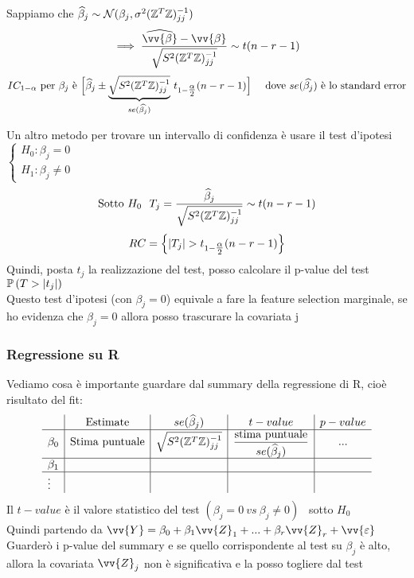 

Sappiamo che 
$\widehat{\beta}_j  \sim \mathcal N(\beta_j, \sigma^2(\mathbb Z^T\mathbb Z)^{-1}_{jj})$
\[
\implies \frac{\hat{\vv{\beta}}-\vv{\beta}}{\sqrt{S^2 (\ZZ^T\ZZ)^{-1}_{jj}}} \sim t(n-r-1)
\]
\[
IC_{1-\alpha} \text{ per } \beta_j  \text{ è } \Big[
\hat{\beta}_j \pm \UB{ se(\hat{\beta_j})}{\sqrt{S^2(\ZZ^T\ZZ)^{-1}_{jj}}} \ t_{1-\tfrac{\alpha}{2}}(n-r-1)\Big] \ \ \ \text{ dove } se (\hat{\beta_j}) \text{ è lo standard error}\skipp
\]
\phantom{}

Un altro metodo per trovare un intervallo di confidenza è usare il  test d'ipotesi $\begin{cases}
    H_0 : \beta_j =0 \\
    H_1 : \beta_j \ne 0
\end{cases}$
\[
\text{Sotto } H_0 \ \ T_j = \dfrac{\widehat{\beta}_j}{\sqrt{S^2(\mathbb Z^T\mathbb Z)^{-1}_{jj}}} \sim t(n-r-1)
\]
\[
RC = \OOO |T_j|> t_{1-\tfrac{\alpha}{2}} (n-r-1) \CCC 
\]
Quindi, posta $t_j$ la realizzazione del test, posso calcolare il p-value del test $\mathbb{P} \left( T>|t_j| \right)$\\

Questo test d'ipotesi (con $\beta_j=0$) equivale a fare la feature selection marginale, se ho evidenza che $\beta_j=0$ allora posso trascurare la covariata j\\

\newpage

\subsubsection*{Regressione su R}

Vediamo cosa è importante guardare dal summary della regressione di R, cioè risultato del fit:
\[
\begin{array}{l|c|c|c|c}

     & \text{Estimate} & se(\widehat{\beta}_j) & t-value & p-value  \\
     \hline
     \beta_0 & \text{Stima puntuale} & \sqrt{S^2(\mathbb Z^T\mathbb Z)^{-1}_{jj}} & \dfrac{\text{stima puntuale}}{se(\widehat{\beta}_j)} & ...\\
     \hline
     \beta_1 &  &  &  & \\
     \hline
     \vdots &  &  &  & \\
\end{array}
\]
Il $t-value$ è il valore statistico del test $(\beta_j=0 \ vs \ \beta_j \ne 0 )$ \, sotto $H_0$\\

Quindi partendo da $\vv{Y}=\beta_0+\beta_1\vv{Z}_1+...+\beta_r\vv{Z}_r +\vv{\eps}$\\
Guarderò i p-value del summary e se quello corrispondente al test su $\beta_j$ è alto, allora la covariata $\vv{Z}_j$ non è significativa e la posso togliere dal test\\

